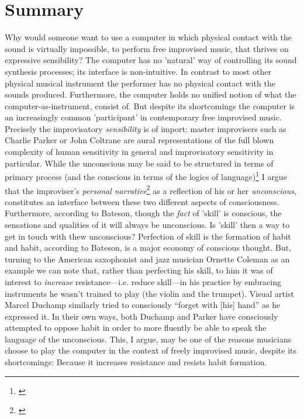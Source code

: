 \section*{Summary}
\label{sec:introduction}
Why would someone want to use a computer in which physical contact
with the sound is virtually impossible, to perform free improvised
music, that thrives on expressive sensibility? The computer has no
'natural' way of controlling its sound synthesis processes; its
interface is non-intuitive. In contrast to most other physical musical
instrument the performer has no physical contact with the sounds
produced.  Furthermore, the computer holds no unified notion of what
the computer-as-instrument, consist of. But despite its shortcomings
the computer is an increasingly common 'participant' in contemporary
free improvised music. Precisely the improvisatory \emph{sensibility}
is of import: master improvisers such as Charlie Parker or John
Coltrane are aural representations of the full blown complexity of
human sensitivity in general and improvisatory sensitivity in
particular. While the unconscious may be said to be structured in
terms of primary process (and the conscious in terms of the logics of
language)\footnote{\cite{bateson72}} I argue that the improviser's
\emph{personal narrative}\footnote{\cite{lewis-1}} as a reflection of
his or her \emph{unconscious}, constitutes an interface between these
two different aspects of consciousness. Furthermore, according to
Bateson, though the \emph{fact} of 'skill' is conscious, the
sensations and qualities of it will always be unconscious. Is 'skill'
then a way to get in touch with thew unconscious? Perfection of skill
is the formation of habit and habit, according to Bateson, is a major
economy of conscious thought. But, turning to the American saxophonist
and jazz musician Ornette Coleman as an example we can note that,
rather than perfecting his skill, to him it was of interest to
\emph{increase} resistance---i.e. reduce skill---in his practice by
embracing instruments he wasn't trained to play (the violin and the
trumpet). Visual artist Marcel Duchamp similarly tried to consciously
``forget with [his] hand'' as he expressed it. In their own ways, both
Duchamp and Parker have consciously attempted to oppose habit in order
to more fluently be able to speak the language of the
unconscious. This, I argue, may be one of the reasons musicians choose
to play the computer in the context of freely improvised music, despite
its shortcomings: Because it increases resistance and resists habit
formation.

